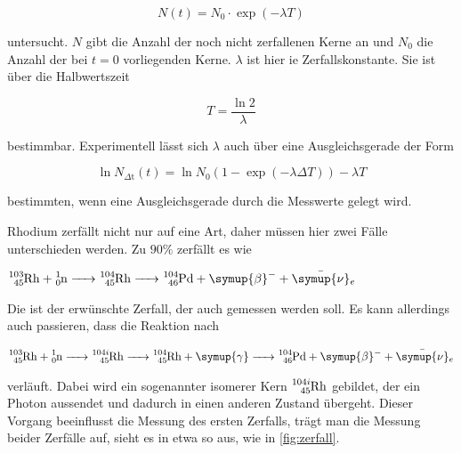 \begin{equation}
    N \left(t\right) = N_0 \cdot \exp(-\lambda T)
    \label{eq:zerfall}
\end{equation}

untersucht.
$N$ gibt die Anzahl der noch nicht zerfallenen Kerne an und $N_0$ die Anzahl der bei $t = 0$ vorliegenden Kerne.
$\lambda$ ist hier ie Zerfallskonstante.
Sie ist über die Halbwertszeit 

\begin{equation}
    T = \frac{\ln{2}}{\lambda}
    \label{eq:lambda}
\end{equation}

bestimmbar.
Experimentell lässt sich $\lambda$ auch über eine Ausgleichsgerade der Form

\begin{equation}
    \ln{N_{\Delta \text{t}}\left(t\right)} = \ln{ N_0 \left(1 - \exp(-\lambda \Delta T) \right)} -\lambda T
    \label{eq:lambda2}
\end{equation}

bestimmten, wenn eine Ausgleichsgerade durch die Messwerte gelegt wird.

Rhodium zerfällt nicht nur auf eine Art, daher müssen hier zwei Fälle unterschieden werden.
Zu $90\%$ zerfällt es wie

$\ce{^{103}_{45}Rh + ^{1}_0n -> ^{104}_{45}Rh -> ^{104}_{46}Pd + \symup{\beta}- + \bar{\symup{\nu}}_e}$

Die ist der erwünschte Zerfall, der auch gemessen werden soll.
Es kann allerdings auch passieren, dass die Reaktion nach

$\ce{^{103}_{45}Rh + ^{1}_0n -> ^{104i}_{45}Rh -> ^{104}_{45}Rh + \symup{\gamma} -> ^{104}_{46}Pd + \symup{\beta}- + \bar{\symup{\nu}}_e}$

verläuft.
Dabei wird ein sogenannter isomerer Kern $\ce{^{104i}_{45}Rh}$ gebildet, der ein Photon aussendet und dadurch in einen anderen Zustand übergeht. 
Dieser Vorgang beeinflusst die Messung des ersten Zerfalls, trägt man die Messung beider Zerfälle auf, sieht es in etwa so aus, wie in \autoref{fig:zerfall}.

